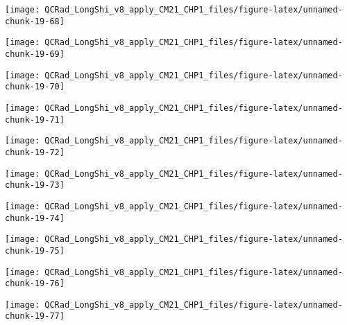 \documentclass[
  10pt,
  a4paper,oneside]{article}
\begin{document}
\begin{center}\texttt{[image: QCRad\_LongShi\_v8\_apply\_CM21\_CHP1\_files/figure-latex/unnamed-chunk-19-68]} \end{center}

\begin{center}\texttt{[image: QCRad\_LongShi\_v8\_apply\_CM21\_CHP1\_files/figure-latex/unnamed-chunk-19-69]} \end{center}

\begin{center}\texttt{[image: QCRad\_LongShi\_v8\_apply\_CM21\_CHP1\_files/figure-latex/unnamed-chunk-19-70]} \end{center}

\begin{center}\texttt{[image: QCRad\_LongShi\_v8\_apply\_CM21\_CHP1\_files/figure-latex/unnamed-chunk-19-71]} \end{center}

\begin{center}\texttt{[image: QCRad\_LongShi\_v8\_apply\_CM21\_CHP1\_files/figure-latex/unnamed-chunk-19-72]} \end{center}

\begin{center}\texttt{[image: QCRad\_LongShi\_v8\_apply\_CM21\_CHP1\_files/figure-latex/unnamed-chunk-19-73]} \end{center}

\begin{center}\texttt{[image: QCRad\_LongShi\_v8\_apply\_CM21\_CHP1\_files/figure-latex/unnamed-chunk-19-74]} \end{center}

\begin{center}\texttt{[image: QCRad\_LongShi\_v8\_apply\_CM21\_CHP1\_files/figure-latex/unnamed-chunk-19-75]} \end{center}

\begin{center}\texttt{[image: QCRad\_LongShi\_v8\_apply\_CM21\_CHP1\_files/figure-latex/unnamed-chunk-19-76]} \end{center}

\begin{center}\texttt{[image: QCRad\_LongShi\_v8\_apply\_CM21\_CHP1\_files/figure-latex/unnamed-chunk-19-77]} \end{center}
\end{document}
